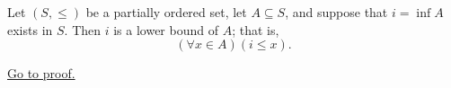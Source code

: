 \begin{proposition}
\label{prop:lower-bound-property-of-infimum}
Let $(S,\leq)$ be a partially ordered set, let $A\subseteq S$, and suppose
that $i=\inf A$ exists in $S$. Then $i$ is a lower bound of $A$; that is,
\[
  (\forall x\in A)(i\leq x).
\]

\hyperref[prf:lower-bound-property-of-infimum]{Go to proof.}
\end{proposition}